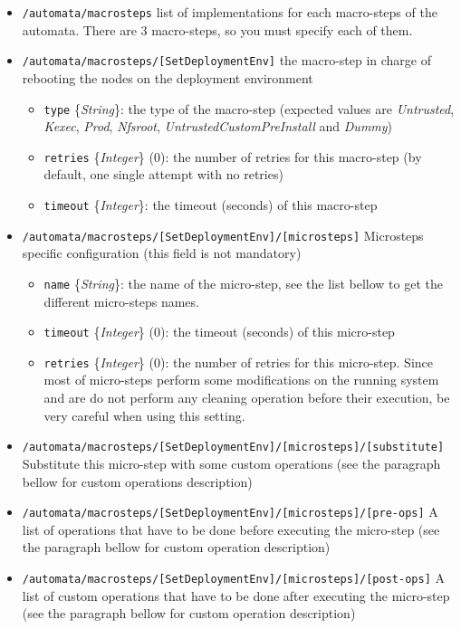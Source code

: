 \documentclass[a4wide,10pt,oneside]{book}
\newcommand{\ypath}[1]{\texttt{#1}}
\newcommand{\yfield}[2]{\texttt{#1} {\small\{{\emph{#2}}\}}:}
\newcommand{\yfieldd}[3]{\texttt{#1} {\small\{{\emph{#2}}\}} {\small(}#3{\small)}:}
\begin{document}
\begin{itemize}
  \item \ypath{/automata/macrosteps} list of implementations for each macro-steps of the automata. There are 3 macro-steps, so you must specify each of them.
  \item \ypath{/automata/macrosteps/[SetDeploymentEnv]} the macro-step in charge of rebooting the nodes on the deployment environment
  \begin{itemize}
    \item \yfield{type}{String} the type of the macro-step (expected values are \emph{Untrusted}, \emph{Kexec}, \emph{Prod}, \emph{Nfsroot}, \emph{UntrustedCustomPreInstall} and \emph{Dummy})
    \item \yfieldd{retries}{Integer}{0} the number of retries for this macro-step (by default, one single attempt with no retries)
    \item \yfield{timeout}{Integer} the timeout (seconds) of this macro-step
  \end{itemize}
  \item \ypath{/automata/macrosteps/[SetDeploymentEnv]/[microsteps]} Microsteps specific configuration (this field is not mandatory)
  \begin{itemize}
    \item \yfield{name}{String} the name of the micro-step, see the list bellow to get the different micro-steps names.
    \item \yfieldd{timeout}{Integer}{0} the timeout (seconds) of this micro-step
    \item \yfieldd{retries}{Integer}{0} the number of retries for this micro-step. Since most of micro-steps perform some modifications on the running system and are do not perform any cleaning operation before their execution, be very careful when using this setting.
  \end{itemize} 
  \item \ypath{/automata/macrosteps/[SetDeploymentEnv]/[microsteps]/[substitute]} Substitute this micro-step with some custom operations (see the paragraph bellow for custom operations description)
  \item \ypath{/automata/macrosteps/[SetDeploymentEnv]/[microsteps]/[pre-ops]} A list of operations that have to be done before executing the micro-step (see the paragraph bellow for custom operation description)
  \item \ypath{/automata/macrosteps/[SetDeploymentEnv]/[microsteps]/[post-ops]} A list of custom operations that have to be done after executing the micro-step (see the paragraph bellow for custom operation description)



\end{itemize}
\end{document}
